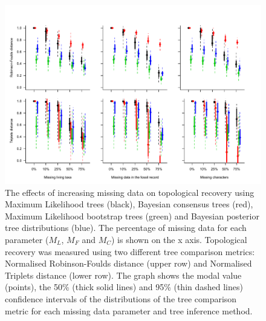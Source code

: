 \documentclass[12pt,letterpaper]{article}
\begin{document}
\begin{figure} 
\centering
    \includegraphics[width=1\textwidth]{Figures/In_main/AllMethods-RF+Tr-colour.pdf}
\caption{The effects of increasing missing data on topological recovery using Maximum Likelihood trees (black), Bayesian consensus trees (red), Maximum Likelihood bootstrap trees (green) and Bayesian posterior tree distributions (blue). The percentage of missing data for each parameter ($M_{L}$, $M_{F}$ and $M_{C}$) is shown on the x axis. Topological recovery was measured using two different tree comparison metrics: Normalised Robinson-Foulds distance (upper row) and Normalised Triplets distance (lower row). The graph shows the modal value (points), the 50\% (thick solid lines) and 95\% (thin dashed lines) confidence intervals of the distributions of the tree comparison metric for each missing data parameter and tree inference method. }
\label{Fig_Results-permeth_perparam} %
\end{figure}


\end{document}

